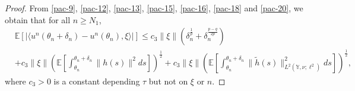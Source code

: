 \documentclass[11pt]{article}
\numberwithin{equation}{section}
\theoremstyle{plain}
\begin{document}
\begin{proof}
 From \eqref{pac-9}, \eqref{pac-12}, \eqref{pac-13}, \eqref{pac-15}, \eqref{pac-16},
 \eqref{pac-18} and \eqref{pac-20}, 
we obtain  that for all $n \ge N_1$, 
  \begin{align} \label{pac-21}
        & \mathbb{E} 
                  \left[ 
                           \Big|  
                                    \langle u^n( \theta_n + \delta_n)
                                                 - u^n(\theta_n), 
                                                 \xi
                                   \rangle
                           \Big| 
                  \right]  
  \le  c_3 \| \xi\|
           \left( \delta_n^{\frac{1}{p} } + \delta_n^{\frac{p-q}{2p} } \right)
           \nonumber\\
          &+ c_3  \| \xi \|
                     \left( \mathbb{E} 
                                     \left[  \int_{\theta_n}^{\theta_n + \delta_n} 
                                                        \| h(s) \|^2
                                                ds 
                                     \right]
                     \right)^{\frac{1}{2} }    
       + c_3 \| \xi \|
                  \left( \mathbb{E} 
                                  \left[ \int_{\theta_n}^{\theta_n + \delta_n} 
                                                    \| \widetilde{h}(s) \|_{L^2(\mathbb{Y}, \nu; \ell^2) }^2        
                                            ds
                                  \right]
                   \right)^{\frac{1}{2} },                                                                             
 \end{align} 
 where $c_3> 0$ is a constant depending 
   $\tau$ but  not on  $\xi$ or $n$.


\end{proof}
\end{document}
